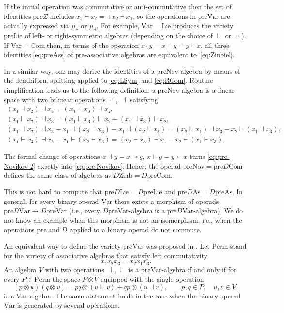 \documentclass[pdftex]{sigma}
\numberwithin{equation}{section}
\def\Var{\mathrm{Var}}
\def\Nov{\mathrm{Nov}}
\def\Com{\mathrm{Com}}
\def\As{\mathrm{As}}
\def\Lie{\mathrm{Lie}}
\def\Perm{\mathrm{Perm}}
\def\Zinb{\mathrm{Zinb}}
\def\pre{\mathrm{pre}}
\begin{document}
If the initial operation was commutative or anti-commutative then the set of identities $\pre\Sigma $
includes $x_1\vdash x_2 = \pm x_2\dashv x_1$,
so the operations in $\pre\Var $ are actually
expressed via $\mu_\vdash $ or $\mu_\dashv $.
For example, $\Var=\Lie$ produces the variety
$\pre\Lie$ of left- or right-symmetric algebras
(depending on the choice of $\vdash $ or $\dashv$).
If $\Var = \Com$ then, in terms of the operation
$x\cdot y = x\dashv y = y\vdash x$,
all three identities \eqref{eq:preAss}
of pre-associative algebras are equivalent to~\eqref{eq:Zinbiel}.

In a similar way, one may derive the identities
of a $\pre\Nov$-algebra by means of the dendriform
splitting applied to \eqref{eq:LSym} and \eqref{eq:RCom}.
Routine simplification leads us to the following
definition: a $\pre\Nov$-algebra is a linear space with
two bilinear operations $\vdash $, $\dashv$ satisfying
%
\begin{gather}
 (x_1\dashv x_2)\dashv x_3 = (x_1\dashv x_3)\dashv x_2, \nonumber\\
 (x_1\vdash x_2)\dashv x_3 = (x_1\vdash x_3)\vdash x_2 + (x_1\dashv x_3)\vdash x_2, \nonumber\\
 (x_1\dashv x_2)\dashv x_3 - x_1\dashv (x_2\dashv x_3) - x_1\dashv (x_2\vdash x_3)
 =
 (x_2\vdash x_1)\dashv x_3 - x_2\vdash (x_1\dashv x_3),
 \nonumber\\
 (x_1\vdash x_3)\dashv x_2 - x_1\vdash (x_2\vdash x_3)
 =
 (x_2\vdash x_3)\dashv x_1 - x_2\vdash (x_1\vdash x_3).\label{eq:pre-Novikov-2}
\end{gather}

The formal change of operations $x\dashv y = x\prec y$, $x\vdash y = y\succ x$
turns \eqref{eq:pre-Novikov-2} exactly into \eqref{eq:pre-Novikov}.
Hence, the operad $\pre\Nov = \pre D\Com$ defines
the same class of algebras as $D\Zinb = D\pre\Com $.

\begin{Remark}
This is not hard to compute that
$\pre D\Lie = D\pre\Lie$ and $\pre D\As = D\pre\As$.
In general, for every binary operad $\Var $ there exists
a morphism of operads $\pre D\Var \to D\pre\Var $
(i.e., every $D\pre\Var $-algebra is a $\pre D\Var$-algebra).
We do not know an example when
this morphism is not an isomorphism, i.e., when the
operations $\pre$ and $D$ applied to a binary operad
do not commute.
\end{Remark}

An equivalent way to define the variety
$\pre\Var $ was proposed in \cite{GubKol2014}.
Let $\Perm $ stand for the variety of associative
algebras that satisfy left commutativity
\[
x_1x_2x_3 = x_2x_1x_3.
\]
An algebra $V$ with two operations $\dashv$, $\vdash $
is a $\pre\Var$-algebra if and only if
for every $P\in \Perm $ the space
$P\otimes V$ equipped with the single operation
%
\begin{equation}\label{eq:Dend-Perm}
(p\otimes u)(q\otimes v) = pq\otimes (u\vdash v) +
qp\otimes (u\dashv v),
\qquad
p,q\in P,\quad u,v\in V,
\end{equation}
%
is a $\Var $-algebra.
The same statement holds in the case when the binary operad
$\Var $ is generated by several operations.
\end{document}
